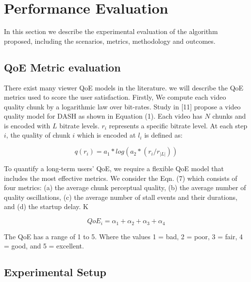 \section{Performance Evaluation}
\label{sec:results}

In this section we describe the experimental evaluation of the algorithm proposed, including the scenarios, metrics, methodology and outcomes.


\subsection{QoE Metric evaluation}

There exist many viewer QoE models in the literature. we will describe the QoE metrics used to score the user satisfaction. Firstly, We compute each video quality chunk by a logarithmic law over bit-rates. Study in [11] propose a video quality model for DASH as shown in Equation (1). Each video has $N$ chunks and is encoded with $L$ bitrate levels. $r_i$ represents a specific bitrate level. At each step $i$, the quality of chunk $i$ which is encoded at $l_i$ is defined as:

$$
q(r_i) = a_1 * log(a_2 * (r_i/ r_{|L|}))
$$

To quantify a long-term users' QoE, we require a flexible QoE model that includes the most effective metrics. 
We consider the Eqn. (7) which consists of four metrics: (a) the average chunk perceptual quality, (b) the average number of quality oscillations, (c) the average number of stall events and their durations, and (d) the startup delay. K

\begin{equation}\label{qoe-equation}
QoE_i = \alpha_1 + \alpha_2 + \alpha_3 + \alpha_4
\end{equation}


The QoE has a range of 1 to 5. Where the values 1 = bad, 2 = poor, 3 = fair, 4 = good, and 5 = excellent.
 
\subsection{Experimental Setup}


